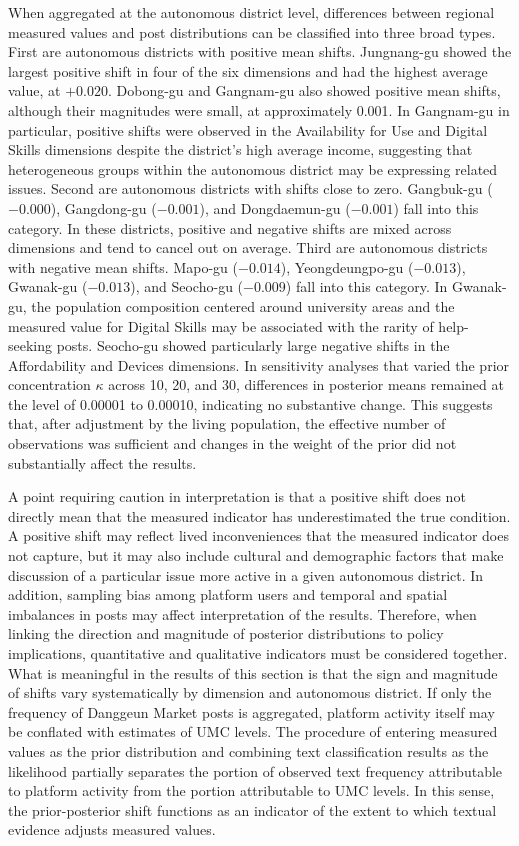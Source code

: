 When aggregated at the autonomous district level, differences between regional measured values and post distributions can be classified into three broad types. First are autonomous districts with positive mean shifts. Jungnang-gu showed the largest positive shift in four of the six dimensions and had the highest average value, at $+0.020$. Dobong-gu and Gangnam-gu also showed positive mean shifts, although their magnitudes were small, at approximately 0.001. In Gangnam-gu in particular, positive shifts were observed in the Availability for Use and Digital Skills dimensions despite the district's high average income, suggesting that heterogeneous groups within the autonomous district may be expressing related issues. Second are autonomous districts with shifts close to zero. Gangbuk-gu ($-0.000$), Gangdong-gu ($-0.001$), and Dongdaemun-gu ($-0.001$) fall into this category. In these districts, positive and negative shifts are mixed across dimensions and tend to cancel out on average. Third are autonomous districts with negative mean shifts. Mapo-gu ($-0.014$), Yeongdeungpo-gu ($-0.013$), Gwanak-gu ($-0.013$), and Seocho-gu ($-0.009$) fall into this category. In Gwanak-gu, the population composition centered around university areas and the measured value for Digital Skills may be associated with the rarity of help-seeking posts. Seocho-gu showed particularly large negative shifts in the Affordability and Devices dimensions. In sensitivity analyses that varied the prior concentration $\kappa$ across 10, 20, and 30, differences in posterior means remained at the level of 0.00001 to 0.00010, indicating no substantive change. This suggests that, after adjustment by the living population, the effective number of observations was sufficient and changes in the weight of the prior did not substantially affect the results.

A point requiring caution in interpretation is that a positive shift does not directly mean that the measured indicator has underestimated the true condition. A positive shift may reflect lived inconveniences that the measured indicator does not capture, but it may also include cultural and demographic factors that make discussion of a particular issue more active in a given autonomous district. In addition, sampling bias among platform users and temporal and spatial imbalances in posts may affect interpretation of the results. Therefore, when linking the direction and magnitude of posterior distributions to policy implications, quantitative and qualitative indicators must be considered together. What is meaningful in the results of this section is that the sign and magnitude of shifts vary systematically by dimension and autonomous district. If only the frequency of Danggeun Market posts is aggregated, platform activity itself may be conflated with estimates of UMC levels. The procedure of entering measured values as the prior distribution and combining text classification results as the likelihood partially separates the portion of observed text frequency attributable to platform activity from the portion attributable to UMC levels. In this sense, the prior-posterior shift functions as an indicator of the extent to which textual evidence adjusts measured values.

